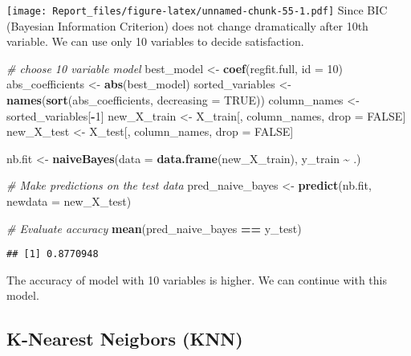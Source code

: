 \documentclass[
]{article}
\newenvironment{Shaded}{\begin{snugshade}}{\end{snugshade}}
\newcommand{\AttributeTok}[1]{\textcolor[rgb]{0.13,0.29,0.53}{#1}}
\newcommand{\CommentTok}[1]{\textcolor[rgb]{0.56,0.35,0.01}{\textit{#1}}}
\newcommand{\ConstantTok}[1]{\textcolor[rgb]{0.56,0.35,0.01}{#1}}
\newcommand{\DecValTok}[1]{\textcolor[rgb]{0.00,0.00,0.81}{#1}}
\newcommand{\FunctionTok}[1]{\textcolor[rgb]{0.13,0.29,0.53}{\textbf{#1}}}
\newcommand{\NormalTok}[1]{#1}
\newcommand{\OtherTok}[1]{\textcolor[rgb]{0.56,0.35,0.01}{#1}}
\newcommand{\SpecialCharTok}[1]{\textcolor[rgb]{0.81,0.36,0.00}{\textbf{#1}}}
\begin{document}
\texttt{[image: Report\_files/figure-latex/unnamed-chunk-55-1.pdf]} Since
BIC (Bayesian Information Criterion) does not change dramatically after
10th variable. We can use only 10 variables to decide satisfaction.

\begin{Shaded}
\begin{Highlighting}[]
\CommentTok{\# choose 10 variable model}
\NormalTok{best\_model }\OtherTok{\textless{}{-}} \FunctionTok{coef}\NormalTok{(regfit.full, }\AttributeTok{id =} \DecValTok{10}\NormalTok{) }
\NormalTok{abs\_coefficients }\OtherTok{\textless{}{-}} \FunctionTok{abs}\NormalTok{(best\_model)}
\NormalTok{sorted\_variables }\OtherTok{\textless{}{-}} \FunctionTok{names}\NormalTok{(}\FunctionTok{sort}\NormalTok{(abs\_coefficients, }\AttributeTok{decreasing =} \ConstantTok{TRUE}\NormalTok{))}
\NormalTok{column\_names }\OtherTok{\textless{}{-}}\NormalTok{ sorted\_variables[}\SpecialCharTok{{-}}\DecValTok{1}\NormalTok{]}
\NormalTok{new\_X\_train }\OtherTok{\textless{}{-}}\NormalTok{ X\_train[, column\_names, drop }\OtherTok{=} \ConstantTok{FALSE}\NormalTok{]}
\NormalTok{new\_X\_test }\OtherTok{\textless{}{-}}\NormalTok{ X\_test[, column\_names, drop }\OtherTok{=} \ConstantTok{FALSE}\NormalTok{]}

\NormalTok{nb.fit }\OtherTok{\textless{}{-}} \FunctionTok{naiveBayes}\NormalTok{(}\AttributeTok{data =} \FunctionTok{data.frame}\NormalTok{(new\_X\_train),}
\NormalTok{                     y\_train }\SpecialCharTok{\textasciitilde{}}\NormalTok{ .)}

\CommentTok{\# Make predictions on the test data}
\NormalTok{pred\_naive\_bayes }\OtherTok{\textless{}{-}} \FunctionTok{predict}\NormalTok{(nb.fit, }\AttributeTok{newdata =}\NormalTok{ new\_X\_test)}

\CommentTok{\# Evaluate accuracy}
\FunctionTok{mean}\NormalTok{(pred\_naive\_bayes }\SpecialCharTok{==}\NormalTok{ y\_test)}
\end{Highlighting}
\end{Shaded}

\begin{verbatim}
## [1] 0.8770948
\end{verbatim}

The accuracy of model with 10 variables is higher. We can continue with
this model.

\hypertarget{k-nearest-neigbors-knn}{%
\subsection{K-Nearest Neigbors (KNN)}\label{k-nearest-neigbors-knn}}
\end{document}
